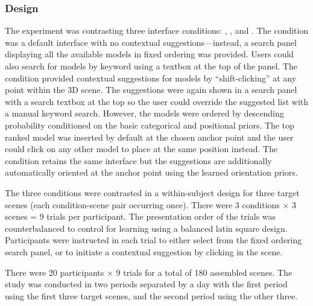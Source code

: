 \documentclass{sigchi}
\begin{document}
\subsubsection{Design}
The experiment was contrasting three interface conditions: \none, \basic, and \full. The \none condition was a default interface with no contextual suggestions---instead, a search panel displaying all the available models in fixed ordering was provided.  Users could also search for models by keyword using a textbox at the top of the panel.  The \basic condition provided contextual suggestions for models by ``shift-clicking'' at any point within the 3D scene.  The suggestions were again shown in a search panel with a search textbox at the top so the user could override the suggested list with a manual keyword search.  However, the models were ordered by descending probability conditioned on the basic categorical and positional priors.  The top ranked model was inserted by default at the chosen anchor point and the user could click on any other model to place at the same position instead.  The \full condition retains the same interface but the suggestions are additionally automatically oriented at the anchor point using the learned orientation priors.

The three conditions were contrasted in a within-subject design for three target scenes (each condition-scene pair occurring once).  There were 3 conditions $\times$ 3 scenes = 9 trials per participant.  The presentation order of the trials was counterbalanced to control for learning using a balanced latin square design.  Participants were instructed in each trial to either select from the fixed ordering search panel, or to initiate a contextual suggestion by clicking in the scene.

There were 20 participants $\times$ 9 trials for a total of 180 assembled scenes.  The study was conducted in two periods separated by a day with the first period using the first three target scenes, and the second period using the other three.
\end{document}
